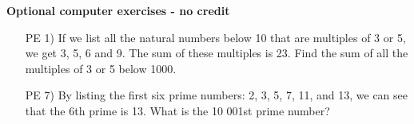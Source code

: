 \documentclass[11pt]{preprint}
\begin{document}
\textbf{Optional computer exercises - no credit}

\begin{enumerate}
\item [PE 1)] If we list all the natural numbers below 10 that are multiples of 3 or 5, we get 3, 5, 6 and 9. The sum of these multiples is 23. Find the sum of all the multiples of 3 or 5 below 1000.
\item [PE 7)] By listing the first six prime numbers: 2, 3, 5, 7, 11, and 13, we can see that the 6th prime is 13. What is the 10 001st prime number?
\end{enumerate}
\end{document}
